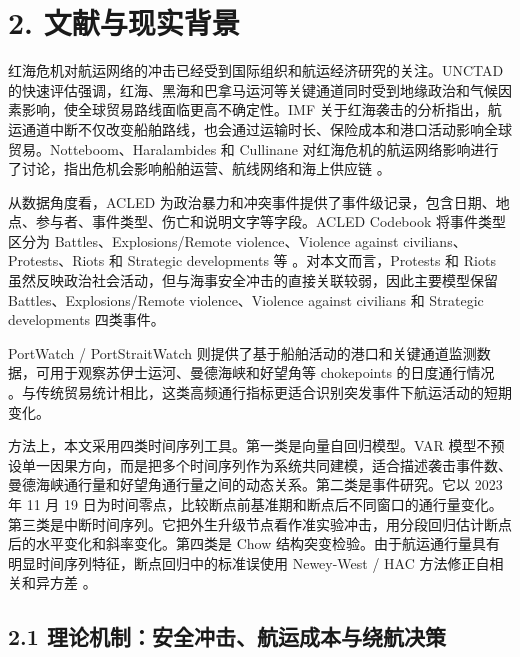 \documentclass[
]{ctexart}
\begin{document}
\section{2.
文献与现实背景}\label{ux6587ux732eux4e0eux73b0ux5b9eux80ccux666f}

红海危机对航运网络的冲击已经受到国际组织和航运经济研究的关注。UNCTAD
的快速评估强调，红海、黑海和巴拿马运河等关键通道同时受到地缘政治和气候因素影响，使全球贸易路线面临更高不确定性。IMF
关于红海袭击的分析指出，航运通道中断不仅改变船舶路线，也会通过运输时长、保险成本和港口活动影响全球贸易。Notteboom、Haralambides
和 Cullinane
对红海危机的航运网络影响进行了讨论，指出危机会影响船舶运营、航线网络和海上供应链
\citep{unctad2024troubled,imf2024redsea,eia2024redsea,notteboom2024red}。

从数据角度看，ACLED
为政治暴力和冲突事件提供了事件级记录，包含日期、地点、参与者、事件类型、伤亡和说明文字等字段。ACLED
Codebook 将事件类型区分为 Battles、Explosions/Remote violence、Violence
against civilians、Protests、Riots 和 Strategic developments
等 \citep{acled_codebook,acled_event_types}。对本文而言，Protests 和 Riots
虽然反映政治社会活动，但与海事安全冲击的直接关联较弱，因此主要模型保留
Battles、Explosions/Remote violence、Violence against civilians 和
Strategic developments 四类事件。

PortWatch / PortStraitWatch
则提供了基于船舶活动的港口和关键通道监测数据，可用于观察苏伊士运河、曼德海峡和好望角等
chokepoints
的日度通行情况 \citep{imf_oxford_portwatch2023}。与传统贸易统计相比，这类高频通行指标更适合识别突发事件下航运活动的短期变化。

方法上，本文采用四类时间序列工具。第一类是向量自回归模型。VAR
模型不预设单一因果方向，而是把多个时间序列作为系统共同建模，适合描述袭击事件数、曼德海峡通行量和好望角通行量之间的动态关系。第二类是事件研究。它以
2023 年 11 月 19
日为时间零点，比较断点前基准期和断点后不同窗口的通行量变化。第三类是中断时间序列。它把外生升级节点看作准实验冲击，用分段回归估计断点后的水平变化和斜率变化。第四类是
Chow
结构突变检验。由于航运通行量具有明显时间序列特征，断点回归中的标准误使用
Newey-West / HAC 方法修正自相关和异方差
\citep{sims1980macroeconomics,lutkepohl2005new,bernal2017interrupted,newey1987simple}。

\subsection{2.1
理论机制：安全冲击、航运成本与绕航决策}\label{ux7406ux8bbaux673aux5236ux5b89ux5168ux51b2ux51fbux822aux8fd0ux6210ux672cux4e0eux7ed5ux822aux51b3ux7b56}
\end{document}
